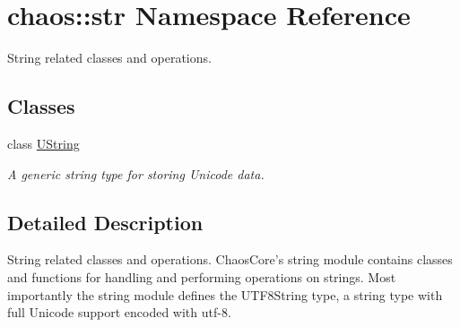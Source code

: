 \hypertarget{namespacechaos_1_1str}{\section{chaos\-:\-:str Namespace Reference}
\label{namespacechaos_1_1str}
}


String related classes and operations.  


\subsection*{Classes}
\begin{DoxyCompactItemize}
\item 
class \hyperlink{classchaos_1_1str_1_1_u_string}{U\-String}
\begin{DoxyCompactList}\small\item\em A generic string type for storing Unicode data. \end{DoxyCompactList}\end{DoxyCompactItemize}


\subsection{Detailed Description}
String related classes and operations. Chaos\-Core's string module contains classes and functions for handling and performing operations on strings. Most importantly the string module defines the U\-T\-F8\-String type, a string type with full Unicode support encoded with utf-\/8. 